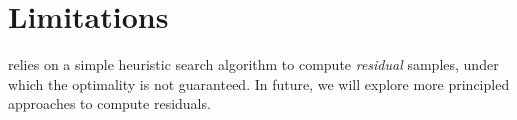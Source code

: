 \section{Limitations}

\modelname relies on a simple heuristic search algorithm to compute \textit{residual} samples, under which the optimality is not guaranteed. In future, we will explore more principled approaches to compute residuals.



